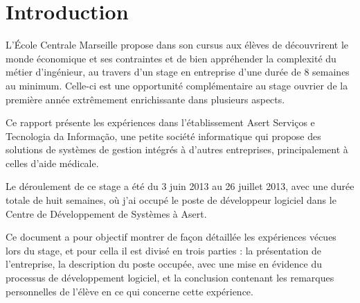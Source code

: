 \chapter{Introduction}

L'École Centrale Marseille propose dans son cursus aux élèves de découvrirent le monde économique et ses contraintes et de bien appréhender la complexité du métier d'ingénieur, au travers d'un stage en entreprise d'une durée de 8 semaines au minimum. Celle-ci est une opportunité complémentaire au stage ouvrier de la première année extrêmement enrichissante dans plusieurs aspects. 

Ce rapport présente les expériences dans l'établissement Asert Serviços e Tecnologia da Informação, une petite société informatique qui propose des solutions de systèmes de gestion intégrés à d'autres entreprises, principalement à celles d'aide médicale.

Le déroulement de ce stage a été du 3 juin 2013 au 26 juillet 2013, avec une durée totale de huit semaines, où j'ai occupé le poste de développeur logiciel dans le Centre de Développement de Systèmes à Asert. 

Ce document a pour objectif montrer de façon détaillée les expériences vécues lors du stage, et pour cella il est divisé en trois parties :  la présentation de l'entreprise, la description du poste occupée, avec une mise en évidence du processus de développement logiciel, et la conclusion contenant les remarques personnelles de l'élève en ce qui concerne cette expérience.
